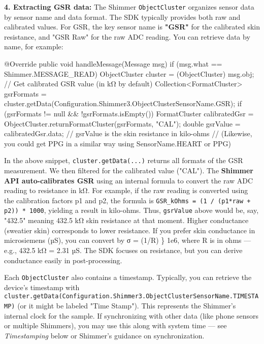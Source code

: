 \textbf{4. Extracting GSR data:} The Shimmer \texttt{ObjectCluster} organizes sensor
data by sensor name and data format. The SDK typically provides both raw
and calibrated values. For GSR, the key sensor name is \textbf{"GSR"} for the
calibrated skin resistance, and "GSR Raw" for the raw ADC reading. You
can retrieve data by name, for example:

    @Override 
    public void handleMessage(Message msg) {
        if (msg.what == Shimmer.MESSAGE_READ) {
            ObjectCluster cluster = (ObjectCluster) msg.obj;
            // Get calibrated GSR value (in kΩ by default)
            Collection<FormatCluster> gsrFormats = cluster.getData(Configuration.Shimmer3.ObjectClusterSensorName.GSR);
            if (gsrFormats != null && !gsrFormats.isEmpty()) {
                FormatCluster calibratedGsr = ObjectCluster.returnFormatCluster(gsrFormats, "CAL"); 
                double gsrValue = calibratedGsr.data; 
                // gsrValue is the skin resistance in kilo-ohms
            }
            // (Likewise, you could get PPG in a similar way using SensorName.HEART or PPG)
        }
    }

In the above snippet, \texttt{cluster.getData(...)} returns all formats of the
GSR measurement. We then filtered for the calibrated value ("CAL"). The
\textbf{Shimmer API auto-calibrates GSR} using an internal formula to convert
the raw ADC reading to resistance in
kΩ\cite{ElectrodermalActivityWiki}.
For example, if the raw reading is converted using the calibration
factors p1 and p2, the formula is
\texttt{GSR\_kOhms = (1 / (p1*raw + p2)) * 1000}\cite{ElectrodermalActivityWiki},
yielding a result in kilo-ohms. Thus, \texttt{gsrValue} above would be, say,
"432.5" meaning 432.5 kΩ skin resistance at that moment. Higher
conductance (sweatier skin) corresponds to lower resistance. If you
prefer skin conductance in microsiemens (µS), you can convert by σ =
(1/R) \} 1e6, where R is in ohms --- e.g., 432.5 kΩ = 2.31 µS. The SDK
focuses on resistance, but you can derive conductance easily in
post-processing.

Each \texttt{ObjectCluster} also contains a timestamp. Typically, you can
retrieve the device's timestamp with
\texttt{cluster.getData(Configuration.Shimmer3.ObjectClusterSensorName.TIMESTAMP)}
(or it might be labeled "Time Stamp"). This represents the Shimmer's
internal clock for the
sample\cite{ContactlessStressThermal2022}\cite{ContactlessStressThermal2022}.
If synchronizing with other data (like phone sensors or multiple
Shimmers), you may use this along with system time --- see \textit{Timestamping}
below or Shimmer's guidance on synchronization.

